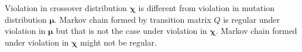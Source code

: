 Violation in crossover distribution $\bm{\chi}$ is different from violation in mutation distribution $\bm{\mu}$. 
Markov chain formed by transition matrix $Q$ is regular under violation in $\bm{\mu}$ but that is not the case under violation in  $\bm{\chi}$. 
Markov chain formed under violation in $\bm{\chi}$ might not be regular.
% 
% 
% 
% 
% 
